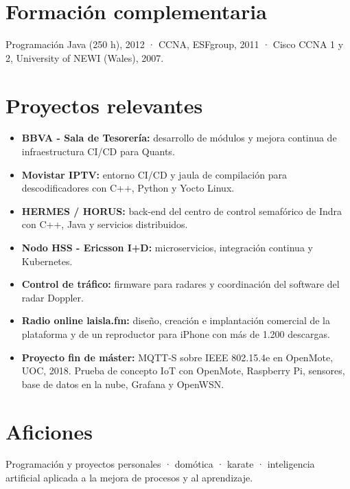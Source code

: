 \documentclass[10pt,a4paper]{article}
\begin{document}
\section{Formación complementaria}
Programación Java (250 h), 2012 · CCNA, ESFgroup, 2011 · Cisco CCNA 1 y 2, University of NEWI (Wales), 2007.

\section{Proyectos relevantes}
\begin{itemize}
  \item \textbf{BBVA - Sala de Tesorería:} desarrollo de módulos y mejora continua de infraestructura CI/CD para Quants.
  \item \textbf{Movistar IPTV:} entorno CI/CD y jaula de compilación para descodificadores con C++, Python y Yocto Linux.
  \item \textbf{HERMES / HORUS:} back-end del centro de control semafórico de Indra con C++, Java y servicios distribuidos.
  \item \textbf{Nodo HSS - Ericsson I+D:} microservicios, integración continua y Kubernetes.
  \item \textbf{Control de tráfico:} firmware para radares y coordinación del software del radar Doppler.
  \item \textbf{Radio online laisla.fm:} diseño, creación e implantación comercial de la plataforma y de un reproductor para iPhone con más de 1.200 descargas.
  \item \textbf{Proyecto fin de máster:} MQTT-S sobre IEEE 802.15.4e en OpenMote, UOC, 2018. Prueba de concepto IoT con OpenMote, Raspberry Pi, sensores, base de datos en la nube, Grafana y OpenWSN.
\end{itemize}

\section{Aficiones}
Programación y proyectos personales · domótica · karate · inteligencia artificial aplicada a la mejora de procesos y al aprendizaje.
\end{document}
